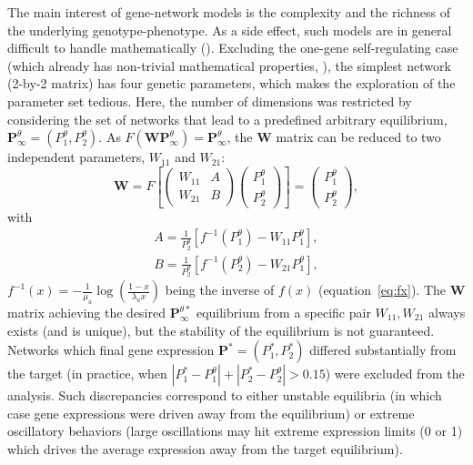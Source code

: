 \documentclass[10pt,a4paper]{article}
\begin{document}
The main interest of gene-network models is the complexity and the richness of the underlying genotype-phenotype. As a side effect, such models are in general difficult to handle mathematically (\cite{CTH11,LP12}). Excluding the one-gene self-regulating case (which already has non-trivial mathematical properties, \citealp{GCL+18}), the simplest network (2-by-2 matrix) has four genetic parameters, which makes the exploration of the parameter set tedious. Here, the number of dimensions was restricted by considering the set of networks that lead to a predefined arbitrary equilibrium, $\bm P^{\theta}_\infty = (P^{\theta}_1, P^{\theta}_2)$. As $F(\bm W \bm P^{\theta}_\infty) = \bm P^{\theta}_\infty$, the $\bm W$ matrix can be reduced to two independent parameters, $W_{11}$ and $W_{21}$:
\begin{equation}
    \bm W = F \left [\begin{pmatrix} W_{11} & A \\ W_{21} & B \end{pmatrix}  \begin{pmatrix} P^{\theta}_1 \\ P^{\theta}_2 \end{pmatrix} \right] = \begin{pmatrix}P^{\theta}_1 \\ P^{\theta}_2 \end{pmatrix},
\end{equation}
\noindent with
\begin{equation}
	\label{eq:predef}
    \begin{split}
        A = \frac{1}{P^{\theta }_2} [f^{-1}(P^{\theta }_1)-W_{11}P^{\theta }_1], \\
        B = \frac{1}{P^{\theta }_2} [f^{-1}(P^{\theta }_2) - W_{21} P^{\theta }_1],
    \end{split}
\end{equation}
\noindent $f^{-1}(x) = -\frac{1}{\mu_a} \log \left( \frac{1-x}{\lambda_a x} \right)$ being the inverse of $f(x)$ (equation~\ref{eq:fx}). The $\bm W$ matrix achieving the desired $\bm P^{\theta \ast}_\infty$ equilibrium from a specific pair $W_{11}, W_{21}$ always exists (and is unique), but the stability of the equilibrium is not guaranteed. Networks which final gene expression $\bm P^\ast = (P^\ast_1,P^\ast_2)$ differed substantially from the target (in practice, when $|P^\ast_1 - P^{\theta}_1| + |P^\ast_2 - P^{\theta}_2| > 0.15$) were excluded from the analysis. Such discrepancies correspond to either unstable equilibria (in which case gene expressions were driven away from the equilibrium) or extreme oscillatory behaviors (large oscillations may hit extreme expression limits (0 or 1) which drives the average expression away from the target equilibrium). 
\end{document}
